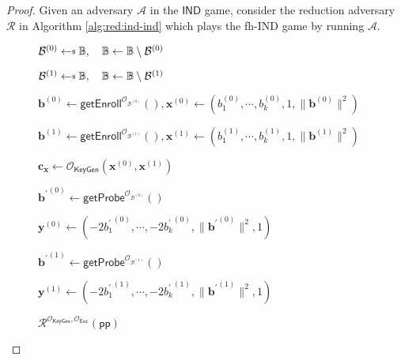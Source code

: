 \begin{proof}

Given an adversary $\mathcal{A}$ in the $\textsf{IND}$ game, consider the reduction adversary $\mathcal{R}$ in Algorithm \ref{alg:red:ind-ind} which plays the \textsf{fh-IND} game by running $\mathcal{A}$.

\begin{figure}[h]
\centering
	
	\begin{minipage}[t]{0.75\linewidth}
	\centering
	\begin{algorithm}[H]
	\caption{$\mathcal{R}^{\mathcal{O}_{\textsf{KeyGen}}, \mathcal{O}_{\textsf{Enc}}}(\textsf{pp})$}
	\label{alg:red:ind-ind}
	\begin{algorithmic}[1]
		\State $\mathcal{B}^{(0)} \getsdollar \mathbb{B}, \quad \mathbb{B} \gets \mathbb{B} \setminus \mathcal{B}^{(0)}$ \label{alg:red:ind-ind:B0}
		
		\State $\mathcal{B}^{(1)} \getsdollar \mathbb{B}, \quad \mathbb{B} \gets \mathbb{B} \setminus \mathcal{B}^{(1)}$ \label{alg:red:ind-ind:B1}

		\State $\mathbf{b}^{(0)} \gets \textsf{getEnroll}^{\mathcal{O}_{\mathcal{B}^{(0)}}}(), \mathbf{x}^{(0)} \gets (b_1^{(0)}, \cdots, b_k^{(0)}, 1, \|\mathbf{b}^{(0)}\|^2)$
		
		\State $\mathbf{b}^{(1)} \gets \textsf{getEnroll}^{\mathcal{O}_{\mathcal{B}^{(1)}}}(), \mathbf{x}^{(1)} \gets (b_1^{(1)}, \cdots, b_k^{(1)}, 1, \|\mathbf{b}^{(1)}\|^2)$
		
		\State $\mathbf{c_x} \gets \mathcal{O}_{\textsf{KeyGen}}(\mathbf{x}^{(0)}, \mathbf{x}^{(1)})$ \label{alg:red:ind-ind:cx}

			
			\State ${\mathbf{b}^\prime}^{(0)} \gets \textsf{getProbe}^{\mathcal{O}_{\mathcal{B}^{(0)}}}()$

			\State $\mathbf{y}^{(0)} \gets (-2{b_1^\prime}^{(0)}, \cdots, -2{b_k^\prime}^{(0)}, \| {\mathbf{b}^\prime}^{(0)} \|^2, 1) $

			\Repeat 
				
				\State ${\mathbf{b}^\prime}^{(1)} \gets \textsf{getProbe}^{\mathcal{O}_{\mathcal{B}^{(1)}}}()$

				\State $\mathbf{y}^{(1)} \gets (-2{b_1^\prime}^{(1)}, \cdots, -2{b_k^\prime}^{(1)}, \| {\mathbf{b}^\prime}^{(1)} \|^2, 1)$

			 \label{alg:red:ind-ind:while}


\end{algorithmic}
\end{algorithm}
\end{minipage}
\end{figure}
\end{proof}
